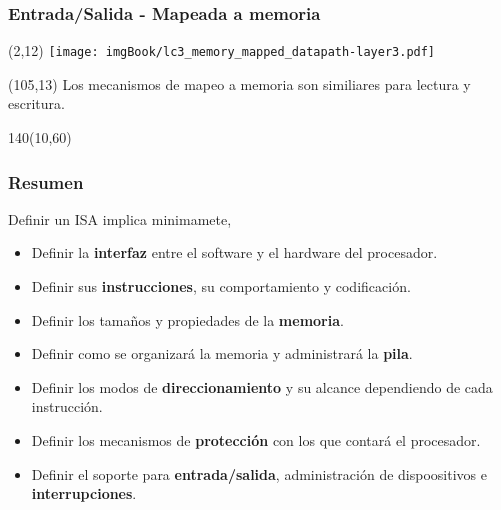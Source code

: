 \documentclass[aspectratio=169]{beamer}
\begin{document}
\begin{frame}[t,fragile]
    \frametitle{Entrada/Salida - Mapeada a memoria}
    \begin{textblock}{65}(2,12) \texttt{[image: imgBook/lc3\_memory\_mapped\_datapath-layer3.pdf]} \end{textblock}
    \begin{textblock}{45}(105,13)
    Los mecanismos de mapeo a memoria son similiares para \textcolor{verdeuca}{lectura y escritura}.\\
    \bigskip
    \end{textblock}
    \begin{textblock}{140}(10,60)
    \bigskip
    \end{textblock}
\end{frame}

\begin{frame}[t,fragile]
    \frametitle{Resumen}
    Definir un ISA implica minimamete,\\
    \vspace{0.4cm}
    \begin{itemize}
    \setlength\itemsep{0.4cm}
    \item<2-> Definir la \textbf{interfaz} entre el software y el hardware del procesador.
    \item<3-> Definir sus \textbf{instrucciones}, su comportamiento y codificación.
    \item<4-> Definir los tamaños y propiedades de la \textbf{memoria}.
    \item<5-> Definir como se organizará la memoria y administrará la \textbf{pila}.
    \item<6-> Definir los modos de \textbf{direccionamiento} y su alcance dependiendo de cada instrucción.
    \item<7-> Definir los mecanismos de \textbf{protección} con los que contará el procesador.
    \item<8-> Definir el soporte para \textbf{entrada/salida}, administración de dispoositivos e \textbf{interrupciones}.
    \end{itemize}
\end{frame}
\end{document}
